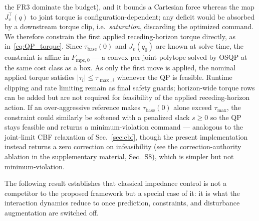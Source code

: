 \documentclass[journal]{IEEEtran}
\newcommand{\Fmpck}[1]{F_{\text{mpc},#1}}
\begin{document}
the FR3 dominate the budget), and it bounds a Cartesian force whereas the map
$J_v^\top(q)$ to joint torque is configuration-dependent; any deficit would
be absorbed by a downstream torque clip, i.e.\ \emph{saturation}, discarding
the optimized command. We therefore constrain the first applied
receding-horizon torque directly, as in~\eqref{eq:QP_torque}. Since
$\tau_{\text{base}}(0)$ and $J_v(q_0)$ are known at solve time, the constraint
is affine in $\Fmpck{0}$ --- a convex per-joint polytope solved by OSQP at the
same cost class as a box. As only the first move is applied, the nominal
applied torque satisfies $|\tau_i|\leq\tau_{\max,i}$ whenever the QP is
feasible. Runtime clipping and rate limiting remain as final safety guards;
horizon-wide torque rows can be added but are not required for feasibility of
the applied receding-horizon action. If an over-aggressive reference makes
$\tau_{\text{base}}(0)$ alone exceed $\tau_{\max}$, the constraint could
similarly be softened with a penalized slack $s\geq0$ so the QP stays
feasible and returns a minimum-violation command --- analogous to the
joint-limit CBF relaxation of Sec.~\ref{sec:cbf}, though the present
implementation instead returns a zero correction on infeasibility (see the
correction-authority ablation in the supplementary material, Sec.~S8),
which is simpler but not minimum-violation.

The following result establishes that classical impedance control is not a
competitor to the proposed framework but a special case of it: it is what the
interaction dynamics reduce to once prediction, constraints, and disturbance
augmentation are switched off.
\end{document}
